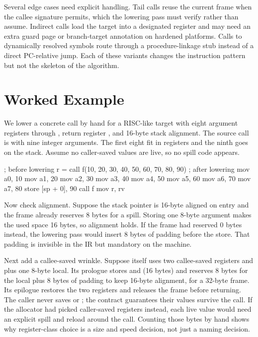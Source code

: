 Several edge cases need explicit handling.
Tail calls reuse the current frame when the callee signature permits, which the lowering pass must verify rather than assume.
Indirect calls load the target into a designated register and may need an extra guard page or branch-target annotation on hardened platforms.
Calls to dynamically resolved symbols route through a procedure-linkage stub instead of a direct PC-relative jump.
Each of these variants changes the instruction pattern but not the skeleton of the algorithm.

\section{Worked Example}\label{sec:ch24-worked}

We lower a concrete call by hand for a RISC-like target with eight argument registers  through , return register , and 16-byte stack alignment.
The source call is  with nine integer arguments.
The first eight fit in registers and the ninth goes on the stack.
Assume no caller-saved values are live, so no spill code appears.
\begin{irlisting}
; before lowering
r = call f(10, 20, 30, 40, 50, 60, 70, 80, 90)
; after lowering
mov a0, 10
mov a1, 20
mov a2, 30
mov a3, 40
mov a4, 50
mov a5, 60
mov a6, 70
mov a7, 80
store [sp + 0], 90
call f
mov r, rv
\end{irlisting}
Now check alignment.
Suppose the stack pointer is 16-byte aligned on entry and the frame already reserves 8 bytes for a spill.
Storing one 8-byte argument makes the used space 16 bytes, so alignment holds.
If the frame had reserved 0 bytes instead, the lowering pass would insert 8 bytes of padding before the store.
That padding is invisible in the IR but mandatory on the machine.

Next add a callee-saved wrinkle.
Suppose  itself uses two callee-saved registers  and  plus one 8-byte local.
Its prologue stores  and  (16 bytes) and reserves 8 bytes for the local plus 8 bytes of padding to keep 16-byte alignment, for a 32-byte frame.
Its epilogue restores the two registers and releases the frame before returning.
The caller never saves  or ; the contract guarantees their values survive the call.
If the allocator had picked caller-saved registers instead, each live value would need an explicit spill and reload around the call.
Counting those bytes by hand shows why register-class choice is a size and speed decision, not just a naming decision.

